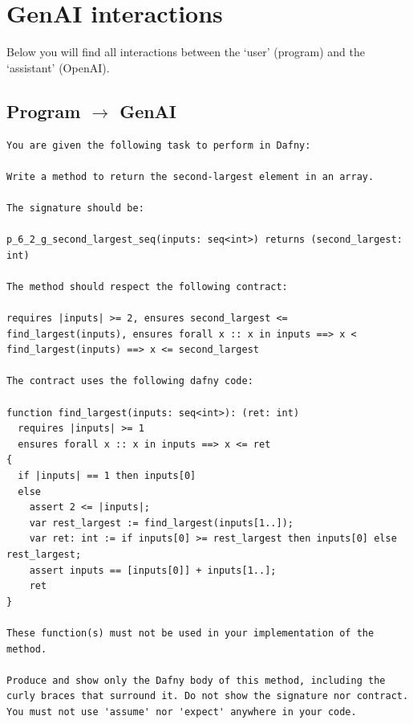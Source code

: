 \documentclass{article}
\begin{document}
\section*{GenAI interactions}
Below you will find all interactions between the `user' (program) and the `assistant' (OpenAI).
\subsection*{Program $\rightarrow$ GenAI}
\begin{lstlisting}
You are given the following task to perform in Dafny:

Write a method to return the second-largest element in an array.

The signature should be:

p_6_2_g_second_largest_seq(inputs: seq<int>) returns (second_largest: int)

The method should respect the following contract:

requires |inputs| >= 2, ensures second_largest <= find_largest(inputs), ensures forall x :: x in inputs ==> x < find_largest(inputs) ==> x <= second_largest

The contract uses the following dafny code:

function find_largest(inputs: seq<int>): (ret: int)
  requires |inputs| >= 1
  ensures forall x :: x in inputs ==> x <= ret
{
  if |inputs| == 1 then inputs[0]
  else 
    assert 2 <= |inputs|;
    var rest_largest := find_largest(inputs[1..]);
    var ret: int := if inputs[0] >= rest_largest then inputs[0] else rest_largest;
    assert inputs == [inputs[0]] + inputs[1..]; 
    ret 
} 

These function(s) must not be used in your implementation of the method.

Produce and show only the Dafny body of this method, including the curly braces that surround it. Do not show the signature nor contract. You must not use 'assume' nor 'expect' anywhere in your code.
\end{lstlisting}
\end{document}
